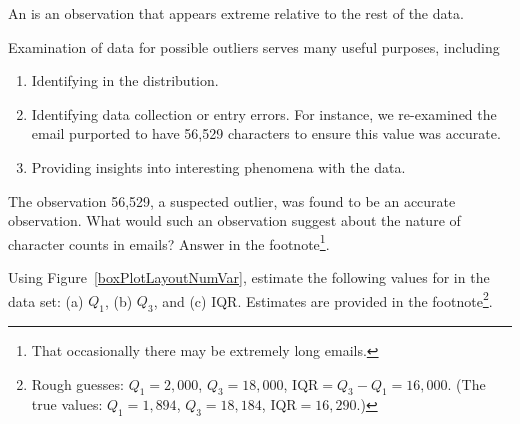\begin{termBox}{
An  is an observation that appears extreme relative to the rest of the data.}
\end{termBox}


\begin{tipBox}{
Examination of data for possible outliers serves many useful purposes, including\vspace{-2mm}
\begin{enumerate}
\setlength{\itemsep}{0mm}
\item Identifying  in the distribution.
\item Identifying data collection or entry errors. For instance, we re-examined the email purported to have 56,529 characters to ensure this value was accurate.
\item Providing insights into interesting phenomena with the data.
\end{enumerate}}
\end{tipBox}

\begin{exercise}
The observation 56,529, a suspected outlier, was found to be an accurate observation. What would such an observation suggest about the nature of character counts in emails? Answer in the footnote\footnote{That occasionally there may be extremely long emails.}. %
\end{exercise}

\begin{exercise}
Using Figure~\ref{boxPlotLayoutNumVar}, estimate the following values for  in the  data set: (a) $Q_1$, (b) $Q_3$, and (c) IQR. Estimates are provided in the footnote\footnote{Rough guesses: $Q_1=2,000$, $Q_3=18,000$, $\text{IQR}=Q_3 - Q_1 = 16,000$. (The true values: $Q_1=1,894$, $Q_3=18,184$, $\text{IQR} = 16,290$.)}.
\end{exercise}


